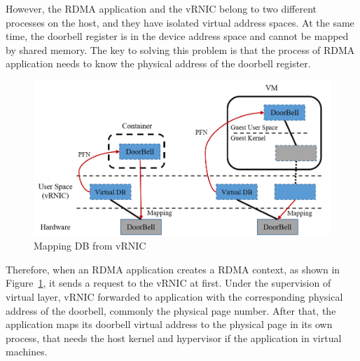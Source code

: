 However, the RDMA application and the vRNIC belong to two different processes on the host, and they have isolated virtual address spaces. At the same time, the doorbell register is in the device address space and cannot be mapped by shared memory. The key to solving this problem is that the process of RDMA application needs to know the physical address of the doorbell register.

\begin{figure}[!ht]
	\centering
	\includegraphics[width=1.0\linewidth]{images/by-pass}
	\caption{Mapping DB from vRNIC}
	\label{fig:by-pass}
\end{figure}

Therefore, when an RDMA application creates a RDMA context, as shown in Figure~\ref{fig:by-pass}, it sends a request to the vRNIC at first. Under the supervision of virtual layer, vRNIC forwarded to application with the corresponding physical address of the doorbell, commonly the physical page number. After that, the application maps its doorbell virtual address to the physical page in its own process, that needs the host kernel and hypervisor if the application in virtual machines.
